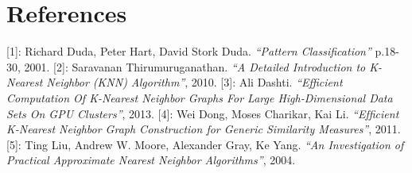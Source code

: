 \chapter{References}

[1]: Richard Duda, Peter Hart, David Stork Duda. 
\textit{``Pattern Classification''} p.18-30, 2001.
[2]: Saravanan Thirumuruganathan. 
\textit{``A Detailed Introduction to K-Nearest Neighbor (KNN) Algorithm''}, 2010. 
[3]: Ali Dashti. 
\textit{``Efficient Computation Of K-Nearest Neighbor Graphs For Large High-Dimensional Data Sets On GPU Clusters''}, 2013.
[4]: Wei Dong, Moses Charikar, Kai Li. 
\textit{``Efﬁcient K-Nearest Neighbor Graph Construction for Generic Similarity Measures''}, 2011.
[5]: Ting Liu, Andrew W. Moore, Alexander Gray, Ke Yang. 
\textit{``An Investigation of Practical Approximate Nearest Neighbor Algorithms''}, 2004.
